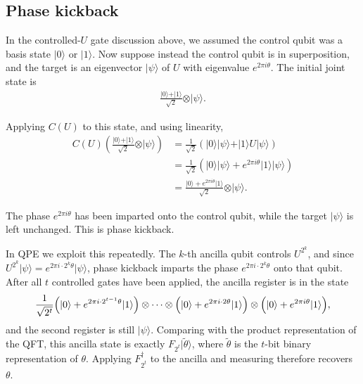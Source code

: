 \documentclass[11pt]{article}
\begin{document}
\subsection{Phase kickback}

In the controlled-$U$ gate discussion above, we assumed the control qubit was a basis state $\vert 0 \rangle$ or $\vert 1 \rangle$. Now suppose instead the control qubit is in superposition, and the target is an eigenvector $\vert \psi \rangle$ of $U$ with eigenvalue $e^{2\pi i \theta}$. The initial joint state is
\begin{align*}
\frac{\vert 0 \rangle + \vert 1 \rangle}{\sqrt{2}} \otimes \vert \psi \rangle.
\end{align*}

Applying $C(U)$ to this state, and using linearity,
\begin{align*}
C(U)\left(\frac{\vert 0 \rangle + \vert 1 \rangle}{\sqrt{2}} \otimes \vert \psi \rangle\right)
&= \frac{1}{\sqrt{2}}\left(\vert 0 \rangle \vert \psi \rangle + \vert 1 \rangle U\vert \psi \rangle\right) \\
&= \frac{1}{\sqrt{2}}\left(\vert 0 \rangle \vert \psi \rangle + e^{2\pi i \theta}\vert 1 \rangle \vert \psi \rangle\right) \\
&= \frac{\vert 0 \rangle + e^{2\pi i \theta}\vert 1 \rangle}{\sqrt{2}} \otimes \vert \psi \rangle.
\end{align*}

The phase $e^{2\pi i \theta}$ has been imparted onto the control qubit, while the target $\vert \psi \rangle$ is left unchanged. This is phase kickback.

In QPE we exploit this repeatedly. The $k$-th ancilla qubit controls $U^{2^k}$, and since $U^{2^k}\vert\psi\rangle = e^{2\pi i \cdot 2^k\theta}\vert\psi\rangle$, phase kickback imparts the phase $e^{2\pi i \cdot 2^k \theta}$ onto that qubit. After all $t$ controlled gates have been applied, the ancilla register is in the state
\begin{align*}
\frac{1}{\sqrt{2^t}}\Bigl(\vert 0 \rangle + e^{2\pi i \cdot 2^{t-1}\theta}\vert 1 \rangle\Bigr)
\otimes \cdots \otimes
\Bigl(\vert 0 \rangle + e^{2\pi i \cdot 2\theta}\vert 1 \rangle\Bigr)
\otimes
\Bigl(\vert 0 \rangle + e^{2\pi i \theta}\vert 1 \rangle\Bigr),
\end{align*}
and the second register is still $\vert \psi \rangle$. Comparing with the product representation of the QFT, this ancilla state is exactly $F_{2^t}\vert \tilde{\theta} \rangle$, where $\tilde{\theta}$ is the $t$-bit binary representation of $\theta$. Applying $F_{2^t}^\dagger$ to the ancilla and measuring therefore recovers $\theta$.
\end{document}
